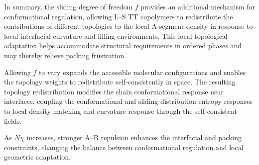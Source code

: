 In summary, the sliding degree of freedom $f$ provides an additional mechanism for conformational regulation, allowing L--S TT copolymers to redistribute the contributions of different topologies to the local A-segment density in response to local interfacial curvature and filling environments.
This local topological adaptation helps accommodate structural requirements in ordered phases and may thereby relieve packing frustration.


Allowing $f$ to vary expands the accessible molecular configurations and enables the topology weights to redistribute self-consistently in space.
The resulting topology redistribution modifies the chain conformational response near interfaces, coupling the conformational and sliding distribution entropy responses to local density matching and curvature response through the self-consistent fields.



As $N\chi$ increases, stronger A--B repulsion enhances the interfacial and packing constraints, changing the balance between conformational regulation and local geometric adaptation.

